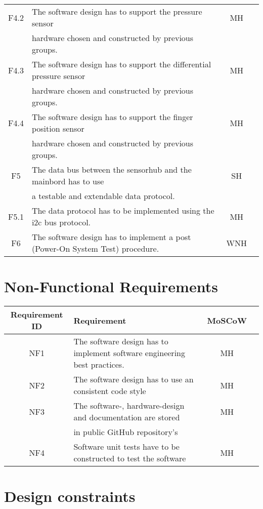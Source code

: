 \begin{tabular}{ |c|l|c|c| }
 F4.2  & The software design has to support the pressure sensor & MH \\
       & hardware chosen and constructed by previous groups. & \\
\hline
 F4.3  & The software design has to support the differential pressure sensor & MH \\
       & hardware chosen and constructed by previous groups. & \\
\hline
 F4.4  & The software design has to support the finger position sensor & MH \\
       & hardware chosen and constructed by previous groups. & \\
\hline
 F5    & The data bus between the sensorhub and the mainbord has to use & SH\\
       & a testable and extendable data protocol. &   \\
 \hline
 F5.1  & The data protocol has to be implemented using the i2c bus protocol. & MH \\
 \hline
 F6    & The software design has to implement a post (Power-On System Test) procedure. & WNH \\ 
 \hline
\end{tabular}

\section{Non-Functional Requirements}
\begin{tabular}{ |c|l|c|c| } 
 \hline
 Requirement ID & Requirement & MoSCoW \\ 
 \hline
 \hline
 NF1    & The software design has to implement software engineering best practices.  & MH \\
 \hline
 NF2    & The software design has to use an consistent code style & MH \\
 \hline 
 NF3    & The software-, hardware-design and documentation are stored  & MH \\
        & in public GitHub repository's & \\
\hline
 NF4   & Software unit tests have to be constructed to test the software & MH\\
 \hline
\end{tabular}
\section{Design constraints}
